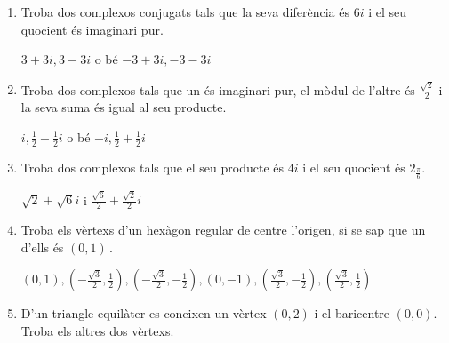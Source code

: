 \begin{enumerate}
\begin{indicacio}
(a) $z_{1}=\left( \sqrt[6]{2}\right) _{\frac{\pi }{12}
},z_{2}=\left( \sqrt[6]{2}\right) _{\frac{9\pi }{12}},z_{3}=\left( \sqrt[6]{2
}\right) _{\frac{17\pi }{12}}$; (b) $z_{1}=2,z_{2}=3i,z_{3}=-3i$; (c) $
z_{1}=\left( \sqrt[6]{2}\right) _{15
^{\circ}
},z_{2}=\left( \sqrt[6]{2}\right) _{135
^{\circ}
},z_{3}=\left( \sqrt[6]{2}\right) _{255
^{\circ}
},z_{4}=\left( \sqrt[6]{2}\right) _{-45
^{\circ}
},z_{5}=\left( \sqrt[6]{2}\right) _{105
^{\circ}
},z_{6}=\left( \sqrt[6]{2}\right) _{225
^{\circ}
}$; (d) $z_{1}=1_{36
^{\circ}
},z_{2}=1_{108
^{\circ}
},z_{3}=1_{252
^{\circ}
},z_{4}=1_{324
^{\circ}
}$; (e) $z_{1}=-8+6i,z_{2}=3+4i$
\end{indicacio}

\item Troba dos complexos conjugats tals que la seva diferència és $6i$ i el seu
quocient és imaginari pur.

\begin{indicacio}
$3+3i,3-3i$ o bé $-3+3i,-3-3i$
\end{indicacio}

\item Troba dos complexos tals que un és imaginari pur, el mòdul
de l’altre és $\frac{\sqrt{2}}{2}$ i la seva suma és igual al seu producte.

\begin{indicacio}
$i,\frac{1}{2}-\frac{1}{2}i$ o bé $-i,\frac{1}{2}+\frac{1}{2}
i$
\end{indicacio}

\item Troba dos complexos tals que el seu producte és $4i$ i el seu quocient és
\thinspace $2_{\frac{\pi }{6}}$.

\begin{indicacio}
$\sqrt{2}+\sqrt{6}i$ i
$\frac{\sqrt{6}}{2}+\frac{\sqrt{2}}{2}i$
\end{indicacio}

\item Troba els vèrtexs d’un hexàgon regular de centre l’origen,
si se sap que un d’ells és $(0,1)\,$.

\begin{indicacio}
$(0,1),\left( -\frac{\sqrt{3}}{2},\frac{1}{2}\right) ,\left( -
\frac{\sqrt{3}}{2},-\frac{1}{2}\right) ,(0,-1),\left( \frac{\sqrt{3}}{2},-
\frac{1}{2}\right) ,\left( \frac{\sqrt{3}}{2},\frac{1}{2}\right)
$
\end{indicacio}

\item D’un triangle equilàter es coneixen un vèrtex $(0,2)$ i
el baricentre $(0,0)$. Troba els altres dos vèrtexs.


\end{enumerate}
